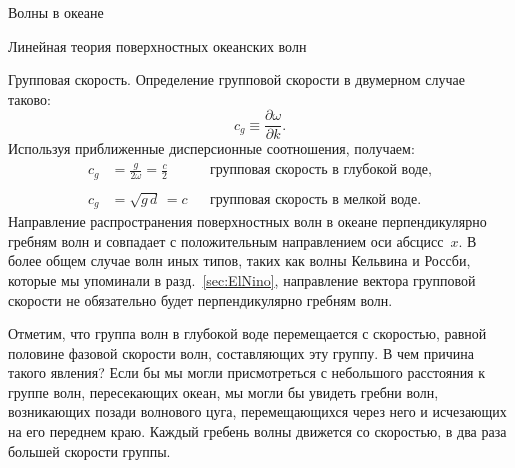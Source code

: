 \begin{chapter}{Волны в океане}
\begin{section}{Линейная теория поверхностных океанских волн}
\begin{paragraph}{Групповая скорость.}
Определение групповой скорости в двумерном случае таково:
\begin{equation}\label{eq:16.9}
  c_{g} \equiv \frac {\partial \omega }{\partial k}.
\end{equation}
Используя приближенные дисперсионные соотношения, получаем:
 \begin{align}
 c_{g} &= \frac{g}{2\omega} = \frac{c}{2} & &   \text{групповая скорость в глубокой воде,}\label{eq:16.10} \\
  & & & \nonumber \\
 c_{g} &= \sqrt{g\,d} \, = c & &   \text{групповая скорость в мелкой воде.}\label{eq:16.11}
 \end{align}
Направление распространения поверхностных волн в океане перпендикулярно
гребням волн и совпадает с положительным направлением оси абсцисс~$x$. 
В более общем случае волн иных типов, таких как волны 
Кельвина и Россби, которые мы
упоминали в разд.~\ref{sec:ElNino}, направление вектора групповой скорости 
не обязательно будет перпендикулярно гребням волн.
%

Отметим, что группа волн в глубокой воде перемещается с скоростью,
равной половине фазовой скорости волн, составляющих эту группу. В чем причина
такого явления? Если бы мы могли присмотреться с небольшого расстояния
к группе волн, пересекающих океан, мы могли бы увидеть гребни волн, 
возникающих позади волнового цуга, перемещающихся через него и исчезающих
на его переднем краю. Каждый гребень волны движется со скоростью,
в два раза большей скорости группы.
%


\end{paragraph}
\end{section}
\end{chapter}
